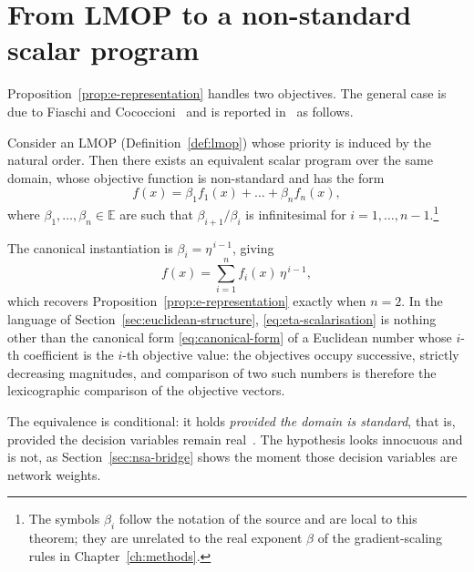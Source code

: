 \section{From LMOP to a non-standard scalar program}
\label{sec:lexico}

Proposition~\ref{prop:e-representation} handles two objectives. The general case is
due to Fiaschi and Cococcioni~\cite{fiaschi2022nonarchimedean} and is reported
in~\cite{fiaschi2024informed} as follows.

\begin{theorem}
\label{thm:lmop-scalar}
Consider an LMOP (Definition~\ref{def:lmop}) whose priority is induced by the natural
order. Then there exists an equivalent scalar program over the same domain, whose
objective function is non-standard and has the form
\begin{equation}
  \label{eq:beta-scalarisation}
  f(x) = \beta_1 f_1(x) + \dots + \beta_n f_n(x),
\end{equation}
where $\beta_1,\dots,\beta_n \in \mathbb{E}$ are such that $\beta_{i+1}/\beta_i$ is
infinitesimal for $i = 1,\dots,n-1$.\footnote{The symbols $\beta_i$ follow the
notation of the source and are local to this theorem; they are unrelated to the real
exponent $\beta$ of the gradient-scaling rules in Chapter~\ref{ch:methods}.}
\end{theorem}

The canonical instantiation is $\beta_i = \eta^{\,i-1}$, giving
\begin{equation}
  \label{eq:eta-scalarisation}
  f(x) = \sum_{i=1}^{n} f_i(x)\,\eta^{\,i-1},
\end{equation}
which recovers Proposition~\ref{prop:e-representation} exactly when $n=2$. In the
language of Section~\ref{sec:euclidean-structure}, \eqref{eq:eta-scalarisation} is
nothing other than the canonical form \eqref{eq:canonical-form} of a Euclidean number
whose $i$-th coefficient is the $i$-th objective value: the objectives occupy
successive, strictly decreasing magnitudes, and comparison of two such numbers is
therefore the lexicographic comparison of the objective vectors.

The equivalence is conditional: it holds \emph{provided the domain is standard},
that is, provided the decision variables remain real~\cite{fiaschi2024informed}. The
hypothesis looks innocuous and is not, as Section~\ref{sec:nsa-bridge} shows the
moment those decision variables are network weights.

